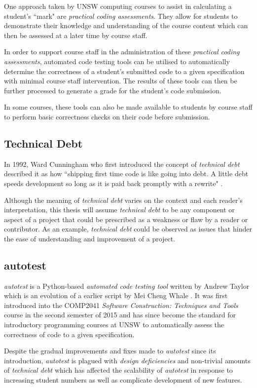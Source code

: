 \documentclass[hidelinks]{report}
\begin{document}
One approach taken by UNSW computing courses to assist in calculating a student's ``mark" are \textit{practical coding assessments}. They allow for students to demonstrate their knowledge and understanding of the course content which can then be assessed at a later time by course staff.

In order to support course staff in the administration of these \textit{practical coding assessments}, automated code testing tools can be utilised to automatically determine the correctness of a student's submitted code to a given specification with minimal course staff intervention. The results of these tools can then be further processed to generate a grade for the student's code submission.

In some courses, these tools can also be made available to students by course staff to perform basic correctness checks on their code before submission. 

\subsection{Technical Debt}
In 1992, Ward Cunningham who first introduced the concept of \textit{technical debt} described it as how ``shipping first time code is like going into debt. A little debt speeds development so long as it is paid back promptly with a rewrite" \cite{TechnicalDebtConcept}.

Although the meaning of \textit{technical debt} varies on the context and each reader's interpretation, this thesis will assume \textit{technical debt} to be any component or aspect of a project that could be prescribed as a weakness or flaw by a reader or contributor. As an example, \textit{technical debt} could be observed as issues that hinder the ease of understanding and improvement of a project. 

\subsection{autotest}
\textit{autotest} is a Python-based \textit{automated code testing tool} written by Andrew Taylor which is an evolution of a earlier script by Mei Cheng Whale \cite{Autotest}. It was first introduced into the COMP2041 \textit{Software Construction: Techniques and Tools} course in the second semester of 2015 and has since become the standard for introductory programming courses at UNSW to automatically assess the correctness of code to a given specification.

Despite the gradual improvements and fixes made to \textit{autotest} since its introduction, \textit{autotest} is plagued with \textit{design deficiencies} and non-trivial amounts of \textit{technical debt} which has affected the scalability of \textit{autotest} in response to increasing student numbers as well as complicate development of new features.
\end{document}
